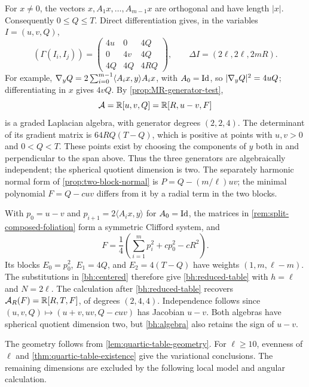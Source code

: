 For $x\ne0$, the vectors \(x,A_1x,\ldots,A_{m-1}x\)
are orthogonal and have length $|x|$. Consequently $0\leq Q\leq T$.
Direct differentiation gives, in the variables $I=(u,v,Q)$,
\begin{equation}\label{bh:original-table}
 (\Gamma(I_i,I_j))=
 \begin{pmatrix}4u&0&4Q\\0&4v&4Q\\4Q&4Q&4RQ\end{pmatrix},
 \qquad
 \Delta I=(2\ell,2\ell,2mR).
\end{equation}
For example,
$\nabla_yQ=2\sum_{i=0}^{m-1}\langle A_i x,y\rangle A_i x$, with $A_0=\operatorname{Id}$,
so $\lvert \nabla_yQ\rvert^2=4uQ$; differentiating in $x$ gives $4vQ$.
By \cref{prop:MR-generator-test},
\begin{equation}\label{bh:algebra}
 \mathcal A=\mathbb R[u,v,Q]=\mathbb R[R,u-v,F]
\end{equation}
is a graded Laplacian algebra, with generator degrees $(2,2,4)$.
The determinant of its gradient matrix is $64RQ(T-Q)$, which is
positive at points with $u,v>0$ and $0<Q<T$. These points exist by
choosing the components of $y$ both in and perpendicular to the
span above. Thus the three generators are algebraically independent;
the spherical quotient dimension is two. The separately harmonic
normal form of \cref{prop:two-block-normal} is
$P=Q-(m/\ell)uv$; the minimal polynomial $F=Q-cuv$ differs from
it by a radial term in the two blocks.

With
$p_0=u-v$ and $p_{i+1}=2\langle A_i x,y\rangle$ for
$A_0=\operatorname{Id}$, the matrices in \cref{rem:split-composed-foliation}
form a symmetric Clifford system, and
\[
 F=\frac14\left(\sum_{i=1}^{m}p_i^2
                    +cp_0^2-cR^2\right).
\]
Its blocks $E_0=p_0^2$, $E_1=4Q$, and $E_2=4(T-Q)$
have weights $(1,m,\ell-m)$. The substitutions in
\eqref{bh:centered} therefore give \eqref{bh:reduced-table} with
$h=\ell$ and $N=2\ell$.
The calculation after \eqref{bh:reduced-table} recovers
$\mathcal A_R(F)=\mathbb R[R,T,F]$, of degrees $(2,4,4)$. Independence follows
since $(u,v,Q)\mapsto(u+v,uv,Q-cuv)$ has Jacobian $u-v$.
Both algebras have spherical quotient dimension two, but
\eqref{bh:algebra} also retains the sign of $u-v$.

The geometry follows from \cref{lem:quartic-table-geometry}. For
$\ell\ge10$, evenness of $\ell$ and
\cref{thm:quartic-table-existence} give the variational conclusions.
The remaining dimensions are excluded by the following local
model and angular calculation.


